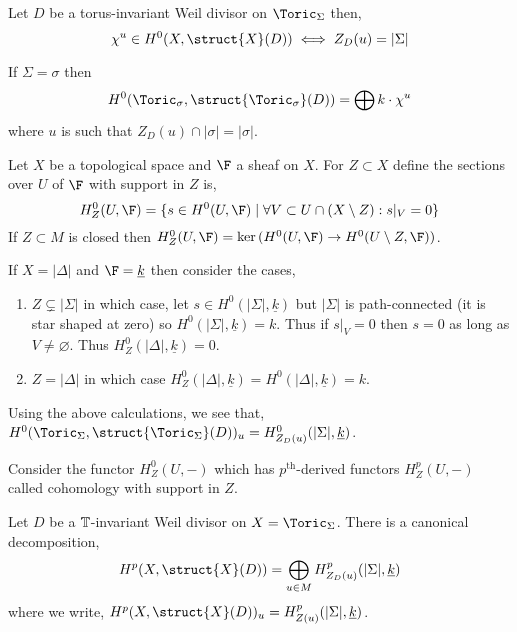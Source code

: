 \begin{corollary}
Let $D$ be a torus-invariant Weil divisor on $\Toric_\Sigma$ then,
\[ \chi^u \in H^0(X, \struct{X}(D)) \iff Z_D(u) = |\Sigma| \]
\end{corollary}

\begin{example}
If $\Sigma = \sigma$ then
\[ H^0(\Toric_\sigma, \struct{\Toric_\sigma}(D)) = \bigoplus k \cdot \chi^u \]
where $u$ is such that $Z_D(u) \cap |\sigma| = |\sigma|$. 
\end{example}

\begin{definition}
Let $X$ be a topological space and $\F$ a sheaf on $X$. For $Z \subset X$ define the sections over $U$ of $\F$ with support in $Z$ is,
\[ H^0_Z(U, \F) = \{ s \in H^0(U, \F) \mid \forall V \subset U \cap (X \setminus Z) : s|_V = 0 \} \]
If $Z \subset M$ is closed then $H^0_Z(U, \F) = \ker{(H^0(U, \F) \to H^0(U \setminus Z, \F))}$. 
\end{definition}

\begin{example}
If $X = |\Delta|$ and $\F = \underline{k}$ then consider the cases,
\begin{enumerate}
\item $Z \subsetneq |\Sigma|$ in which case, let $s \in H^0(|\Sigma|, \underline{k})$ but $|\Sigma|$ is path-connected (it is star shaped at zero) so $H^0(|\Sigma|, \underline{k}) = k$. Thus if $s|_V = 0$ then $s = 0$ as long as $V \neq \varnothing$. Thus $H_Z^0(|\Delta|, \underline{k}) = 0$.
\item $Z = |\Delta|$ in which case $H_Z^0(|\Delta|, \underline{k}) = H^0(|\Delta|, \underline{k}) = k$. 
\end{enumerate}
\end{example}

\begin{proposition}
Using the above calculations, we see that,
$H^0(\Toric_\Sigma, \struct{\Toric_\Sigma}(D))_u = H^0_{Z_D(u)}(|\Sigma|, \underline{k})$.
\end{proposition}

\begin{definition}
Consider the functor $H^0_Z(U, -)$ which has $p^{\text{th}}$-derived functors $H_Z^p(U, -)$ called cohomology with support in $Z$. 
\end{definition}

\begin{theorem}
Let $D$ be a $\mathbb{T}$-invariant Weil divisor on $X = \Toric_\Sigma$. There is a canonical decomposition,
\[ H^p(X, \struct{X}(D)) = \bigoplus_{u \in M} H^p_{Z_D(u)}(|\Sigma|, \underline{k}) \]
where we write, $H^p(X, \struct{X}(D))_u = H^p_{Z(u)}(|\Sigma|, \underline{k})$.
\end{theorem}

